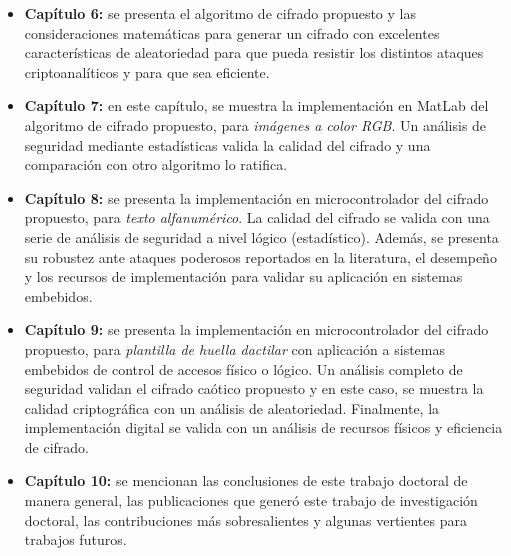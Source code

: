\begin{itemize}
\item \textbf{Capítulo 6:} se presenta el algoritmo de cifrado propuesto y las consideraciones matemáticas para generar un cifrado con excelentes características de aleatoriedad para que pueda resistir los distintos ataques criptoanalíticos y para que sea eficiente.
\item \textbf{Capítulo 7:} en este capítulo, se muestra la implementación en MatLab del algoritmo de cifrado propuesto, para \textit{imágenes a color RGB}. Un análisis de seguridad mediante estadísticas valida la calidad del cifrado y una comparación con otro algoritmo lo ratifica.
\item \textbf{Capítulo 8:} se presenta la implementación en microcontrolador del cifrado propuesto, para \textit{texto alfanumérico}. La calidad del cifrado se valida con una serie de análisis de seguridad  a nivel lógico (estadístico). Además, se presenta su robustez ante ataques poderosos reportados en la literatura, el desempeño y los recursos de implementación para validar su aplicación en sistemas embebidos.
\item \textbf{Capítulo 9:} se presenta la implementación en microcontrolador del cifrado propuesto, para \textit{plantilla de huella dactilar} con aplicación a sistemas embebidos de control de accesos físico o lógico. Un análisis completo de seguridad validan el cifrado caótico propuesto y en este caso, se muestra la calidad criptográfica con un análisis de aleatoriedad. Finalmente, la implementación digital se valida con un análisis de recursos físicos y eficiencia de cifrado.
\item \textbf{Capítulo 10:} se mencionan las conclusiones de este trabajo doctoral de manera general, las publicaciones que generó este trabajo de investigación doctoral, las contribuciones más sobresalientes y algunas vertientes para trabajos futuros. 
\end{itemize}
 


